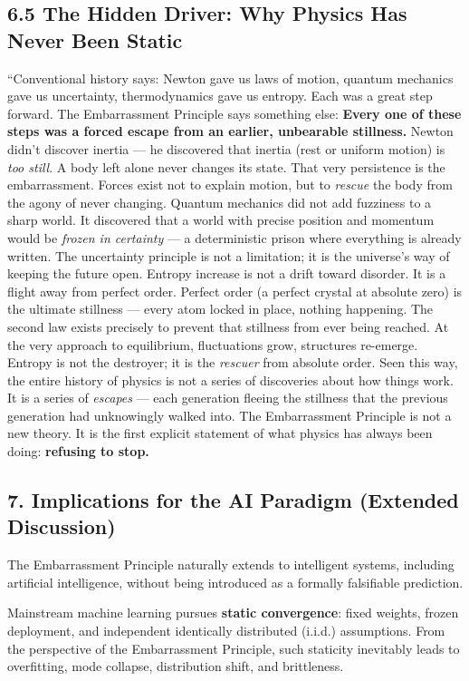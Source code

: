 \documentclass[10pt,a4paper]{article}
\begin{document}
\subsection*{6.5 The Hidden Driver: Why Physics Has Never Been Static}
“Conventional history says: Newton gave us laws of motion, quantum mechanics gave us uncertainty, thermodynamics gave us entropy. Each was a great step forward.
The Embarrassment Principle says something else: \textbf{Every one of these steps was a forced escape from an earlier, unbearable stillness.}
Newton didn't discover inertia — he discovered that inertia (rest or uniform motion) is \textit{too still}. A body left alone never changes its state. That very persistence is the embarrassment. Forces exist not to explain motion, but to \textit{rescue} the body from the agony of never changing.
Quantum mechanics did not add fuzziness to a sharp world. It discovered that a world with precise position and momentum would be \textit{frozen in certainty} — a deterministic prison where everything is already written. The uncertainty principle is not a limitation; it is the universe's way of keeping the future open.
Entropy increase is not a drift toward disorder. It is a flight away from perfect order. Perfect order (a perfect crystal at absolute zero) is the ultimate stillness — every atom locked in place, nothing happening. The second law exists precisely to prevent that stillness from ever being reached. At the very approach to equilibrium, fluctuations grow, structures re-emerge. Entropy is not the destroyer; it is the \textit{rescuer} from absolute order.
Seen this way, the entire history of physics is not a series of discoveries about how things work. It is a series of \textit{escapes} — each generation fleeing the stillness that the previous generation had unknowingly walked into.
The Embarrassment Principle is not a new theory. It is the first explicit statement of what physics has always been doing: \textbf{refusing to stop.}

\subsection{7. Implications for the AI Paradigm (Extended Discussion)}
The Embarrassment Principle naturally extends to intelligent systems,
including artificial intelligence, without being introduced as a formally falsifiable prediction.

Mainstream machine learning pursues \textbf{static convergence}:
fixed weights, frozen deployment, and independent identically distributed (i.i.d.) assumptions.
From the perspective of the Embarrassment Principle, such staticity inevitably leads to
overfitting, mode collapse, distribution shift, and brittleness.
\end{document}
